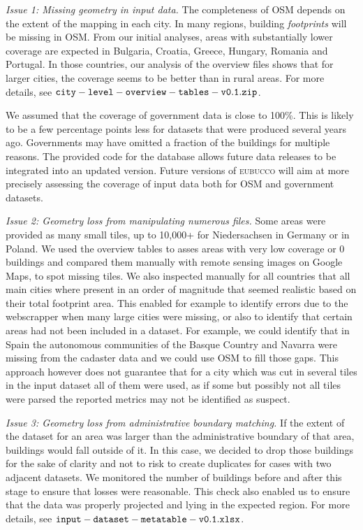 \documentclass[fleqn,10pt]{wlscirep}
\begin{document}
\medskip  \noindent \textit{Issue 1: Missing geometry in input data.} \hspace{0.1cm} The completeness of OSM depends on the extent of the mapping in each city. In many regions, building \textit{footprints} will be missing in OSM. From our initial analyses, areas with substantially lower coverage are expected in Bulgaria, Croatia, Greece, Hungary, Romania and Portugal. In those countries, our analysis of the overview files shows that for larger cities, the coverage seems to be better than in rural areas. For more details, see ${\tt city-level-overview-tables-v0.1.zip}$. 

We assumed that the coverage of government data is close to 100\%. This is likely to be a few percentage points less for datasets that were produced several years ago. Governments may have omitted a fraction of the buildings for multiple reasons. The provided code for the database allows future data releases to be integrated into an updated version.
Future versions of \textsc{eubucco} will aim at more precisely assessing the coverage of input data both for OSM and government datasets.

\medskip \noindent \textit{Issue 2: Geometry loss from manipulating numerous files.} \hspace{0.1cm} Some areas were provided as many small tiles, up to 10,000+ for Niedersachsen in Germany or in Poland. We used the overview tables to asses areas with very low coverage or 0 buildings and compared them manually with remote sensing images on Google Maps, to spot missing tiles. We also inspected manually for all countries that all main cities where present in an order of magnitude that seemed realistic based on their total footprint area. This enabled for example to identify errors due to the webscrapper when many large cities were missing, or also to identify that certain areas had not been included in a dataset. For example, we could identify that in Spain the autonomous communities of the Basque Country and Navarra were missing from the cadaster data and we could use OSM to fill those gaps.  This approach however does not guarantee that for a city which was cut in several tiles in the input dataset all of them were used, as if some but possibly not all tiles were parsed the reported metrics may not be identified as suspect. 

\medskip \noindent \textit{Issue 3: Geometry loss from administrative boundary matching.} \hspace{0.1cm} If the extent of the dataset for an area was larger than the administrative boundary of that area, buildings would fall outside of it. In this case, we decided to drop those buildings for the sake of clarity and not to risk to create duplicates for cases with two adjacent datasets. We monitored the number of buildings before and after this stage to ensure that losses were reasonable. This check also enabled us to ensure that the data was properly projected and lying in the expected region. For more details, see ${\tt input-dataset-metatable-v0.1.xlsx}$.  
\end{document}
